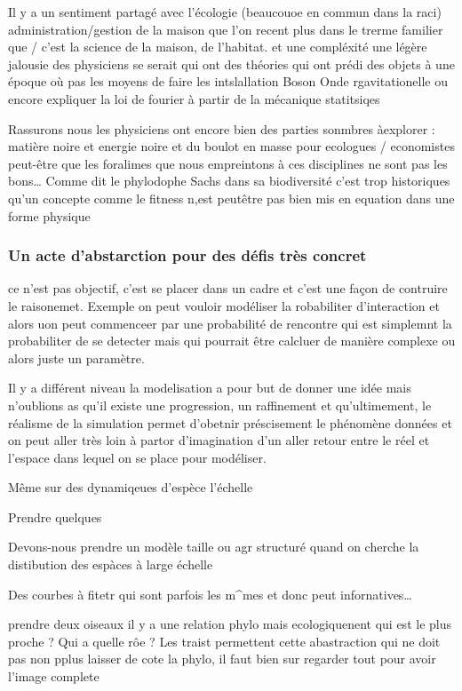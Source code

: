 Il y a un sentiment partagé avec l'écologie (beaucouoe en commun dans la
raci) administration/gestion de la maison que l'on recent plus dans le
trerme familier que / c'est la science de la maison, de l'habitat. et
une compléxité une légère jalousie des physiciens se serait qui ont des
théories qui ont prédi des objets à une époque où pas les moyens de
faire les intslallation Boson Onde rgavitationelle ou encore expliquer
la loi de fourier à partir de la mécanique statitsiqes

Rassurons nous les physiciens ont encore bien des parties sonmbres
àexplorer : matière noire et energie noire et du boulot en masse pour
ecologues / economistes peut-être que les foralimes que nous empreintons
à ces disciplines ne sont pas les bons\ldots{} Comme dit le phylodophe
Sachs dans sa biodiversité c'est trop historiques qu'un concepte comme
le fitness n,est peutêtre pas bien mis en equation dans une forme
physique

\subsubsection{Un acte d'abstarction pour des défis très
concret}\label{un-acte-dabstarction-pour-des-duxe9fis-truxe8s-concret}

ce n'est pas objectif, c'est se placer dans un cadre et c'est une façon
de contruire le raisonemet. Exemple on peut vouloir modéliser la
robabiliter d'interaction et alors uon peut commenceer par une
probabilité de rencontre qui est simplemnt la probabiliter de se
detecter mais qui pourrait être calcluer de manière complexe ou alors
juste un paramètre.

Il y a différent niveau la modelisation a pour but de donner une idée
mais n'oublions as qu'il existe une progression, un raffinement et
qu'ultimement, le réalisme de la simulation permet d'obetnir
préscisement le phénomène données et on peut aller très loin à partor
d'imagination d'un aller retour entre le réel et l'espace dans lequel on
se place pour modéliser.

Même sur des dynamiqeues d'espèce l'échelle

Prendre quelques

Devons-nous prendre un modèle taille ou agr structuré quand on cherche
la distibution des espàces à large échelle

Des courbes à fitetr qui sont parfois les m\^{}mes et donc peut
infornatives\ldots{}

prendre deux oiseaux il y a une relation phylo mais ecologiquenent qui
est le plus proche ? Qui a quelle rôe ? Les traist permettent cette
abastraction qui ne doit pas non pplus laisser de cote la phylo, il faut
bien sur regarder tout pour avoir l'image complete

